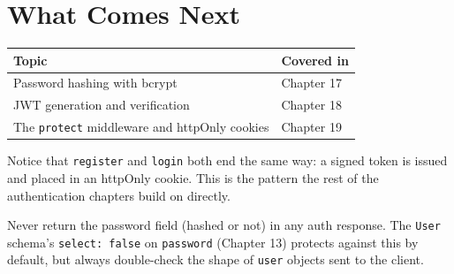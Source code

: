 \section{What Comes Next}

\begin{table}[h]
\centering
\begin{tabularx}{\textwidth}{l X}
\toprule
\textbf{Topic} & \textbf{Covered in} \\
\midrule
Password hashing with bcrypt        & Chapter 17 \\
JWT generation and verification      & Chapter 18 \\
The \texttt{protect} middleware and httpOnly cookies & Chapter 19 \\
\bottomrule
\end{tabularx}
\end{table}

\begin{notebox}[NOTE]
Notice that \texttt{register} and \texttt{login} both end the same way: a signed token is
issued and placed in an httpOnly cookie. This is the pattern the rest of the
authentication chapters build on directly.
\end{notebox}

\begin{warnbox}[WARNING]
Never return the password field (hashed or not) in any auth response. The \texttt{User}
schema's \texttt{select: false} on \texttt{password} (Chapter 13) protects against this by
default, but always double-check the shape of \texttt{user} objects sent to the client.
\end{warnbox}
